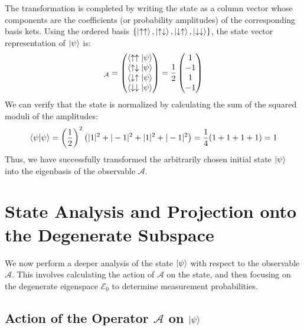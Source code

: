 \documentclass[11pt,a4paper]{article}
\begin{document}
The transformation is completed by writing the state as a column vector whose components are the coefficients (or probability amplitudes) of the corresponding basis kets. Using the ordered basis $\{\ket{\uparrow\uparrow}, \ket{\uparrow\downarrow}, \ket{\downarrow\uparrow}, \ket{\downarrow\downarrow}\}$, the state vector representation of $\ket{\psi}$ is:
\begin{equation}
    [\psi]_{\mathcal{A}} =
    \begin{pmatrix}
        \braket{\uparrow\uparrow | \psi} \\
        \braket{\uparrow\downarrow | \psi} \\
        \braket{\downarrow\uparrow | \psi} \\
        \braket{\downarrow\downarrow | \psi}
    \end{pmatrix}
    =
    \frac{1}{2}
    \begin{pmatrix}
         1 \\
        -1 \\
         1 \\
        -1
    \end{pmatrix}
\end{equation}
We can verify that the state is normalized by calculating the sum of the squared moduli of the amplitudes:
\begin{equation}
    \braket{\psi|\psi} = \left(\frac{1}{2}\right)^2 \left( |1|^2 + |-1|^2 + |1|^2 + |-1|^2 \right) = \frac{1}{4}(1+1+1+1) = 1
\end{equation}
Thus, we have successfully transformed the arbitrarily chosen initial state $\ket{\psi}$ into the eigenbasis of the observable $\mathcal{A}$.

\section{State Analysis and Projection onto the Degenerate Subspace}

We now perform a deeper analysis of the state $\ket{\psi}$ with respect to the observable $\mathcal{A}$. This involves calculating the action of $\mathcal{A}$ on the state, and then focusing on the degenerate eigenspace $\mathcal{E}_0$ to determine measurement probabilities.

\subsection{Action of the Operator $\mathcal{A}$ on $\ket{\psi}$}
\end{document}
